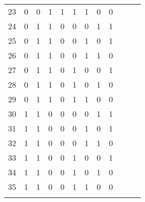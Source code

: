 \documentclass[a4paper,12pt]{article}
\begin{document}
\begin{center}
\begin{longtable}{c|cccccccc|rrr}
23 & 0 & 0 & 1 & 1 & 1 & 1 & 0 & 0 & \\
24 & 0 & 1 & 1 & 0 & 0 & 0 & 1 & 1 & \\
25 & 0 & 1 & 1 & 0 & 0 & 1 & 0 & 1 & \\ \midrule
26 & 0 & 1 & 1 & 0 & 0 & 1 & 1 & 0 & \\
27 & 0 & 1 & 1 & 0 & 1 & 0 & 0 & 1 & \\
28 & 0 & 1 & 1 & 0 & 1 & 0 & 1 & 0 & \\
29 & 0 & 1 & 1 & 0 & 1 & 1 & 0 & 0 & \\
30 & 1 & 1 & 0 & 0 & 0 & 0 & 1 & 1 & \\ \midrule
31 & 1 & 1 & 0 & 0 & 0 & 1 & 0 & 1 & \\
32 & 1 & 1 & 0 & 0 & 0 & 1 & 1 & 0 & \\
33 & 1 & 1 & 0 & 0 & 1 & 0 & 0 & 1 & \\
34 & 1 & 1 & 0 & 0 & 1 & 0 & 1 & 0 & \\
35 & 1 & 1 & 0 & 0 & 1 & 1 & 0 & 0 & \\* \midrule

\clearpage


\end{longtable}
\end{center}
\end{document}
